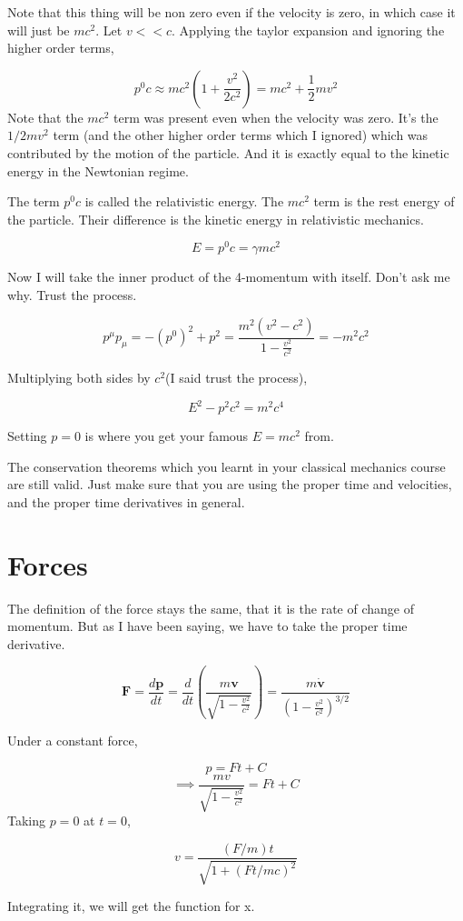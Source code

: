 \documentclass[12pt]{article}
\begin{document}
Note that this thing will be non zero even if the velocity is zero, in which case it will just be $mc^2$. 
Let $v<<c$. Applying the taylor expansion and ignoring the higher order terms,


    \[ 
    p^0c \approx mc^2\left(1+\frac{v^2}{2c^2}\right) = mc^2 + \frac{1}{2}mv^2 
    \]
Note that the $mc^2$ term was present even when the velocity was zero. It's the $1/2 mv^2$ term (and the other higher order terms which I ignored) which was 
contributed by the motion of the particle. And it is exactly equal to the kinetic energy in the Newtonian regime.

The term $p^0c$ is called the relativistic energy. The $mc^2$ term is the rest energy of the particle. Their difference is the kinetic energy in relativistic mechanics. 

\[E = p^0c = \gamma mc^2\]

Now I will take the inner product of the 4-momentum with itself. Don't ask me why. Trust the process. 

\[p^{\mu}p_{\mu} = -(p^0)^2 + p^2 =\frac{m^2(v^2-c^2)}{1-\frac{v^2}{c^2}}=-m^2c^2\]

Multiplying both sides by $c^2$(I said trust the process),

\[E^2 - p^2c^2 = m^2c^4\]

Setting $p=0$ is where you get your famous $E=mc^2$ from. 

The conservation theorems which you learnt in your classical mechanics course are still valid. Just make sure that you are using 
the proper time and velocities, and the proper time derivatives in general. 

\section{Forces}
The definition of the force stays the same, that it is the rate of change of momentum. But as I have been saying, 
we have to take the proper time derivative. 

\[\mathbf{F} = \frac{d\mathbf{p}}{dt} = \frac{d}{dt}\left(\frac{m\mathbf{v}}{\sqrt{1-\frac{v^2}{c^2}}}\right)= \frac{m\dot{\mathbf{v}}}{\left(1-\frac{v^2}{c^2}\right)^{3/2}}\]

Under a constant force, 

\[p = Ft + C\]
\[\implies \frac{mv}{\sqrt{1-\frac{v^2}{c^2}}} = Ft + C\]
Taking $p=0$ at $t=0$,

\[v = \frac{(F/m)t}{\sqrt{1+(Ft/mc)^2}}\]

Integrating it, we will get the function for x. 
\end{document}
